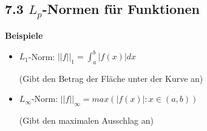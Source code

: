\subsection{7.3 $L_p$-Normen für Funktionen}{
\vskip1pt

\begin{center}
\end{center}
\vspace{6pt}

\textbf{Beispiele} \par \vskip1pt
\begin{itemize}[leftmargin=0.29cm, itemsep=0.5pt]
\item $L_1$-Norm: $||f||_1 = \int_{a}^{b}|f(x)| dx$ \par (Gibt den Betrag der Fläche unter der Kurve an)
\item $L_\infty$-Norm: $||f||_\infty = max(|f(x)| : x \in (a, b))$ \par (Gibt den maximalen Ausschlag an)
\end{itemize}
}
\WhiteSpace
